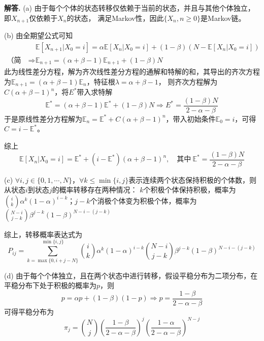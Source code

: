 \documentclass[12pt, a4paper, oneside]{ctexart}
\newenvironment{solution}[1][]{\par\noindent\textbf{#1解答. }}{\smallskip\par}  %
\def\E{\mathbb{E}}          %
\def\add{\vspace{1ex}}      %
\begin{document}
\begin{solution}
    (a) 由于每个个体的状态转移仅依赖于当前的状态，并且与其他个体独立，即$X_{n+1}$仅依赖于$X_n$的状态，
    满足Markov性，因此$\{X_n,n\geqslant 0\}$是Markov链。

    (b) 由全期望公式可知
    \begin{align*}
        &\ \E[X_{n+1}|X_0=i] = \alpha\E[X_{n}|X_0=i] + (1-\beta)(N-\E[X_n|X_0=i])\\
        \text{（简记）}\Rightarrow&\ \E_{n+1} = (\alpha+\beta-1)\E_{n+1} + (1-\beta)N
    \end{align*}
    此为线性差分方程，解为齐次线性差分方程的通解和特解的和，其导出的齐次方程为$\E_{n+1}=(\alpha+\beta-1)\E_{n}$，特征根$\lambda = \alpha+\beta-1$，
    则齐次方程解为$C(\alpha+\beta-1)^n$，将$E^*$带入求特解
    \begin{equation*}
        \E^* = (\alpha+\beta-1)\E^* + (1-\beta)N\Rightarrow E^* = \frac{(1-\beta)N}{2-\alpha-\beta}
    \end{equation*}
    于是原线性差分方程解为$\E_n = \E^*+C(\alpha+\beta-1)^n$，带入初始条件$\E_0 = i$，可得$C = i - \E^*$。
    
    综上
    \begin{equation*}
        \E[X_n|X_0=i] = \E^*+(i-\E^*)(\alpha+\beta-1)^n,\quad\text{其中}\ \E^* = \frac{(1-\beta)N}{2-\alpha-\beta}
    \end{equation*}

    (c) $\forall i, j\in\{0,1,\cdots,N\}$，\add $\forall k\leqslant\min\{i,j\}$表示连续两个状态保持积极的个体数，则从状态$i$到状态$j$的概率转移存在两种情况：
    $k$个积极个体保持积极，概率为$\binom{i}{k}\alpha^k(1-\alpha)^{i-k}$；$j-k$个消极个体变为积极个体，概率为
    $\binom{N-i}{j-k}\beta^{j-k}(1-\beta)^{N-i-(j-k)}$
    
    综上，转移概率表达式为
    \begin{equation*}
        P_{ij} = \sum_{k=\max\{0,i+j-N\}}^{\min\{i,j\}}\binom{i}{k}\alpha^k(1-\alpha)^{i-k}\binom{N-i}{j-k}\beta^{j-k}(1-\beta)^{N-i-(j-k)}
    \end{equation*}

    (d) 由于每个个体独立，且在两个状态中进行转移，假设平稳分布为二项分布，在平稳分布下处于积极的概率为$p$，则
    \begin{equation*}
        p = \alpha p+(1-\beta)(1-p)\Rightarrow p = \frac{1-\beta}{2-\alpha-\beta}
    \end{equation*}
    可得平稳分布为
    \begin{equation*}
        \pi_j = \binom{N}{j}\left(\frac{1-\beta}{2-\alpha-\beta}\right)^j\left(\frac{1-\alpha}{2-\alpha-\beta}\right)^{N-j}
    \end{equation*}
\end{solution}
\end{document}
